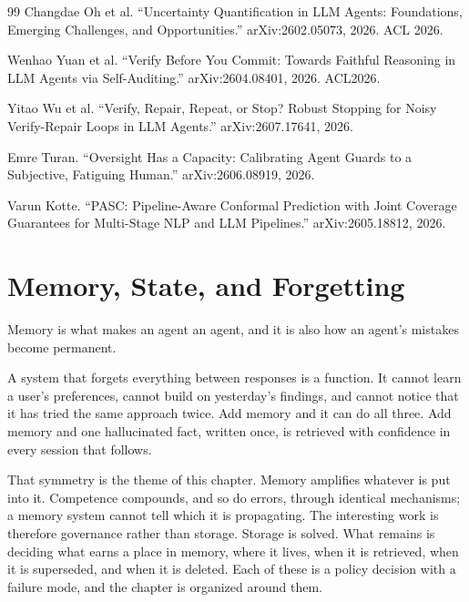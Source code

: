 \documentclass[11pt]{book}
\begin{document}
\begin{thebibliography}{99}
Changdae Oh et al.
``Uncertainty Quantification in LLM Agents: Foundations, Emerging Challenges, and Opportunities.''
arXiv:2602.05073, 2026. ACL 2026.

Wenhao Yuan et al.
``Verify Before You Commit: Towards Faithful Reasoning in LLM Agents via Self-Auditing.''
arXiv:2604.08401, 2026. ACL2026.

Yitao Wu et al.
``Verify, Repair, Repeat, or Stop? Robust Stopping for Noisy Verify-Repair Loops in LLM Agents.''
arXiv:2607.17641, 2026.

Emre Turan.
``Oversight Has a Capacity: Calibrating Agent Guards to a Subjective, Fatiguing Human.''
arXiv:2606.08919, 2026.

Varun Kotte.
``PASC: Pipeline-Aware Conformal Prediction with Joint Coverage Guarantees for Multi-Stage NLP and LLM Pipelines.''
arXiv:2605.18812, 2026.
\end{thebibliography}

\chapter{Memory, State, and Forgetting}
\label{ch:memory}

Memory is what makes an agent an agent, and it is also how an agent's mistakes become permanent.

A system that forgets everything between responses is a function. It cannot learn a user's preferences, cannot build on yesterday's findings, and cannot notice that it has tried the same approach twice. Add memory and it can do all three. Add memory and one hallucinated fact, written once, is retrieved with confidence in every session that follows.

That symmetry is the theme of this chapter. Memory amplifies whatever is put into it. Competence compounds, and so do errors, through identical mechanisms; a memory system cannot tell which it is propagating. The interesting work is therefore governance rather than storage. Storage is solved. What remains is deciding what earns a place in memory, where it lives, when it is retrieved, when it is superseded, and when it is deleted. Each of these is a policy decision with a failure mode, and the chapter is organized around them.
\end{document}
